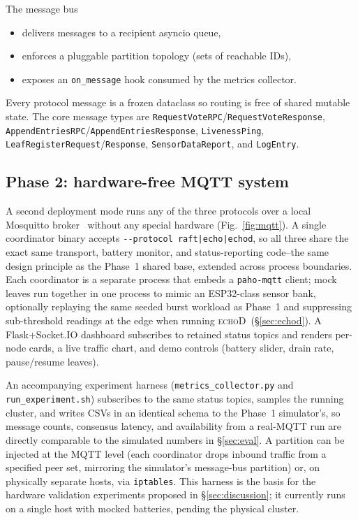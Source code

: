 \documentclass[conference]{IEEEtran}
\newcommand{\echodproto}{\textsc{echoD}\xspace}
\begin{document}
The message bus
\begin{itemize}
\item delivers messages to a recipient asyncio queue,
\item enforces a pluggable partition topology (sets of reachable IDs),
\item exposes an \texttt{on\_message} hook consumed by the metrics
  collector.
\end{itemize}
Every protocol message is a frozen dataclass so routing is free of
shared mutable state. The core message types are
\texttt{RequestVoteRPC}/\texttt{RequestVoteResponse},
\texttt{AppendEntriesRPC}/\texttt{AppendEntriesResponse},
\texttt{LivenessPing}, \texttt{LeafRegisterRequest}/\texttt{Response},
\texttt{SensorDataReport}, and \texttt{LogEntry}.

\subsection{Phase 2: hardware-free MQTT system}
A second deployment mode runs any of the three protocols over a local
Mosquitto broker~\cite{light2017mosquitto} without any special hardware
(Fig.~\ref{fig:mqtt}). A single coordinator binary accepts
\texttt{-{}-protocol raft|echo|echod}, so all three share the exact
same transport, battery monitor, and status-reporting code--the same
design principle as the Phase~1 shared base, extended across process
boundaries. Each coordinator is a separate process that embeds a
\texttt{paho-mqtt} client; mock leaves run together in one process to
mimic an ESP32-class sensor bank, optionally replaying the same seeded
burst workload as Phase~1 and suppressing sub-threshold readings at the
edge when running \echodproto\ (\S\ref{sec:echod}). A Flask+Socket.IO
dashboard subscribes to retained status topics and renders per-node
cards, a live traffic chart, and demo controls (battery slider, drain
rate, pause/resume leaves).

An accompanying experiment harness (\texttt{metrics\_collector.py} and
\texttt{run\_experiment.sh}) subscribes to the same status topics,
samples the running cluster, and writes CSVs in an identical schema to
the Phase~1 simulator's, so message counts, consensus latency, and
availability from a real-MQTT run are directly comparable to the
simulated numbers in \S\ref{sec:eval}. A partition can be injected at
the MQTT level (each coordinator drops inbound traffic from a specified
peer set, mirroring the simulator's message-bus partition) or, on
physically separate hosts, via \texttt{iptables}. This harness is the
basis for the hardware validation experiments proposed in
\S\ref{sec:discussion}; it currently runs on a single host with mocked
batteries, pending the physical cluster.
\end{document}
